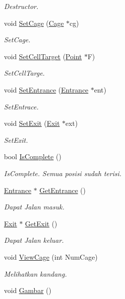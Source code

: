 \begin{DoxyCompactItemize}
\begin{DoxyCompactList}\small\item\em Destructor. \end{DoxyCompactList}\item 
void \hyperlink{class_cell_ad70276595dd9580bcb2061eee98a9d46}{Set\+Cage} (\hyperlink{class_cage}{Cage} $\ast$cg)
\begin{DoxyCompactList}\small\item\em Set\+Cage. \end{DoxyCompactList}\item 
void \hyperlink{class_cell_aa47f53266d2a27481fcb970def270e8d}{Set\+Cell\+Target} (\hyperlink{class_point}{Point} $\ast$F)
\begin{DoxyCompactList}\small\item\em Set\+Cell\+Targe. \end{DoxyCompactList}\item 
void \hyperlink{class_cell_a86e546014ede1b012beb9f9212e678f9}{Set\+Entrance} (\hyperlink{class_entrance}{Entrance} $\ast$ent)
\begin{DoxyCompactList}\small\item\em Set\+Entrace. \end{DoxyCompactList}\item 
void \hyperlink{class_cell_a7c072eb0334e6388da600892d66cf50a}{Set\+Exit} (\hyperlink{class_exit}{Exit} $\ast$ext)
\begin{DoxyCompactList}\small\item\em Set\+Exit. \end{DoxyCompactList}\item 
bool \hyperlink{class_cell_a04ab2d9a4c5762aed152d95e87e0cb66}{Is\+Complete} ()
\begin{DoxyCompactList}\small\item\em Is\+Complete. Semua posisi sudah terisi. \end{DoxyCompactList}\item 
\hyperlink{class_entrance}{Entrance} $\ast$ \hyperlink{class_cell_a5e1c5d15a31f158612353950542d4666}{Get\+Entrance} ()
\begin{DoxyCompactList}\small\item\em Dapat Jalan masuk. \end{DoxyCompactList}\item 
\hyperlink{class_exit}{Exit} $\ast$ \hyperlink{class_cell_aead10dd501dd9f079315a795954b1eb8}{Get\+Exit} ()
\begin{DoxyCompactList}\small\item\em Dapat Jalan keluar. \end{DoxyCompactList}\item 
void \hyperlink{class_cell_a1a2b8b7070e95a4c565b862b75b776dd}{View\+Cage} (int Num\+Cage)
\begin{DoxyCompactList}\small\item\em Melihatkan kandang. \end{DoxyCompactList}\item 
void \hyperlink{class_cell_a36b9bdb556fca04fb90e5d2279ba1cfd}{Gambar} ()\hypertarget{class_cell_a36b9bdb556fca04fb90e5d2279ba1cfd}{}\label{class_cell_a36b9bdb556fca04fb90e5d2279ba1cfd}


\end{DoxyCompactItemize}
